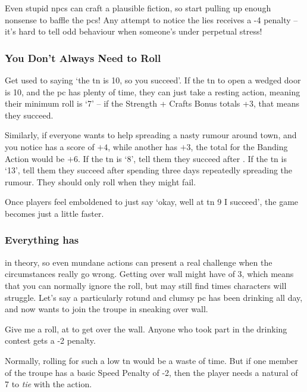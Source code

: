 \begin{multicols}{2}
Even stupid \glspl{npc} can craft a plausible fiction, so start pulling up enough nonsense to baffle the \glspl{pc}!
Any attempt to notice the lies receives a -4 penalty -- it's hard to tell odd behaviour when someone's under perpetual stress!

\subsubsection{You Don't Always Need to Roll}

Get used to saying `the \gls{tn} is 10, so you succeed'.
If the \gls{tn} to open a wedged door is 10, and the \gls{pc} has plenty of time, they can just take a resting action, meaning their minimum roll is `7' -- if the Strength + Crafts Bonus totals +3, that means they succeed.

Similarly, if everyone wants to help spreading a nasty rumour around town, and you notice  has a  score of $+4$, while another has $+3$, the total for the Banding Action%
would be $+6$.
If the \gls{tn} is `8', tell them they succeed after .
If the \gls{tn} is `13', tell them they succeed after spending three days repeatedly spreading the rumour.
They should only roll when they might fail.

Once players feel emboldened to just say `okay, well at \gls{tn} 9 I succeed', the game becomes just a little faster.

\subsubsection{Everything has }
in theory, so even mundane actions can present a real challenge when the circumstances really go wrong.
Getting over  wall might have  of 3, which means that you can normally ignore the roll, but may still find times characters will struggle.
Let's say a particularly rotund and clumsy \gls{pc} has been drinking all day, and now wants to join the troupe in sneaking over  wall.

\begin{speechtext}
  Give me a  roll, at \tn[3] to get over the wall.
  Anyone who took part in the drinking contest gets a -2 penalty.
\end{speechtext}

Normally, rolling for such a low \gls{tn} would be a waste of time.
But if one member of the troupe has a basic Speed Penalty of -2, then the player needs a \gls{natural} of 7 to \emph{tie} with the action.


\end{multicols}
